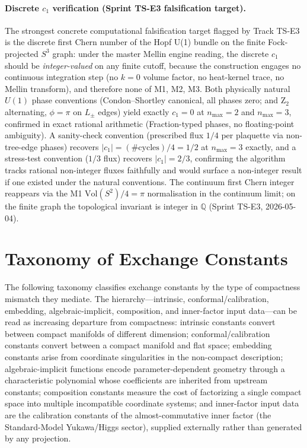 \documentclass[aps,pra,twocolumn,superscriptaddress,longbibliography]{revtex4-2}
\begin{document}
\paragraph{Discrete $c_1$ verification (Sprint TS-E3 falsification target).}
The strongest concrete computational falsification target flagged by Track
TS-E3 is the discrete first Chern number of the Hopf U(1) bundle on the
finite Fock-projected $S^3$ graph: under the master Mellin engine reading,
the discrete $c_1$ should be \emph{integer-valued} on any finite cutoff,
because the construction engages no continuous integration step (no
$k = 0$ volume factor, no heat-kernel trace, no Mellin transform), and
therefore none of M1, M2, M3.  Both physically natural $U(1)$
phase conventions (Condon--Shortley canonical, all phases zero; and Z$_2$
alternating, $\phi = \pi$ on $L_\pm$ edges) yield exactly $c_1 = 0$ at
$n_{\max} = 2$ and $n_{\max} = 3$, confirmed in exact rational arithmetic
(Fraction-typed phases, no floating-point ambiguity).  A sanity-check
convention (prescribed flux $1/4$ per plaquette via non-tree-edge phases)
recovers $|c_1| = (\#\text{cycles}) / 4 = 1/2$ at $n_{\max} = 3$ exactly,
and a stress-test convention ($1/3$ flux) recovers $|c_1| = 2/3$,
confirming the algorithm tracks rational non-integer fluxes faithfully
and would surface a non-integer result if one existed under the natural
conventions.  The continuum first Chern integer reappears via the M1
$\mathrm{Vol}(S^2)/4 = \pi$ normalisation in the continuum limit; on the
finite graph the topological invariant is integer in $\mathbb{Q}$
(Sprint TS-E3, 2026-05-04).



\section{Taxonomy of Exchange Constants}
\label{sec:taxonomy}

The following taxonomy classifies exchange constants by the type of
compactness mismatch they mediate.  The hierarchy---intrinsic,
conformal/calibration, embedding, algebraic-implicit, composition,
and inner-factor input data---can be read as increasing departure from
compactness: intrinsic constants convert between compact manifolds of
different dimension; conformal/calibration constants convert between a
compact manifold and flat space; embedding constants arise from
coordinate singularities in the non-compact description;
algebraic-implicit functions encode parameter-dependent geometry
through a characteristic polynomial whose coefficients are inherited
from upstream constants; composition constants measure the cost of
factorizing a single compact space into multiple incompatible
coordinate systems; and inner-factor input data are the calibration
constants of the almost-commutative inner factor (the Standard-Model
Yukawa/Higgs sector), supplied externally rather than generated by any
projection.
\end{document}
